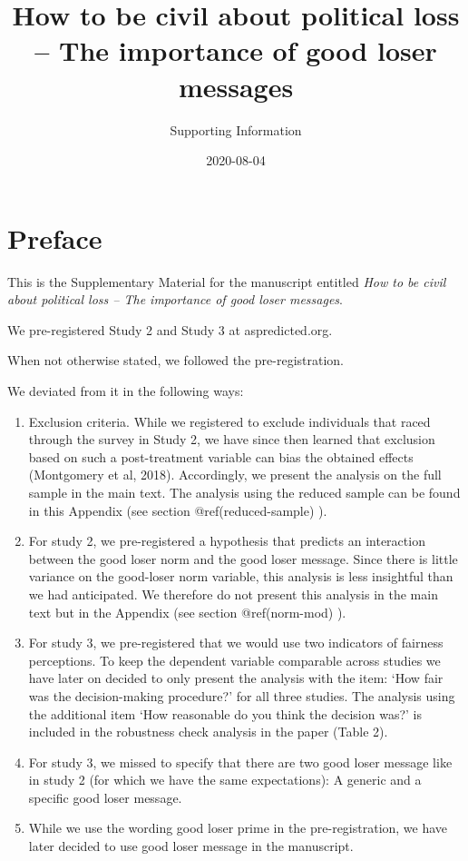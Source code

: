 \documentclass[
]{book}
\title{How to be civil about political loss -- The importance of good loser
messages}
\subtitle{Supporting Information}
\author{}
\date{\vspace{-2.5em}2020-08-04}
\begin{document}
\frontmatter
\maketitle

\mainmatter
\hypertarget{preface}{%
\chapter{Preface}\label{preface}}

This is the Supplementary Material for the manuscript entitled \emph{How
to be civil about political loss -- The importance of good loser
messages}.

We pre-registered Study 2 and Study 3 at aspredicted.org.

When not otherwise stated, we followed the pre-registration.

We deviated from it in the following ways:

\begin{enumerate}
\def\labelenumi{\arabic{enumi}.}
\item
  Exclusion criteria. While we registered to exclude individuals that
  raced through the survey in Study 2, we have since then learned that
  exclusion based on such a post-treatment variable can bias the
  obtained effects (Montgomery et al, 2018). Accordingly, we present the
  analysis on the full sample in the main text. The analysis using the
  reduced sample can be found in this Appendix (see section
  @ref(reduced-sample) ).
\item
  For study 2, we pre-registered a hypothesis that predicts an
  interaction between the good loser norm and the good loser message.
  Since there is little variance on the good-loser norm variable, this
  analysis is less insightful than we had anticipated. We therefore do
  not present this analysis in the main text but in the Appendix (see
  section @ref(norm-mod) ).
\item
  For study 3, we pre-registered that we would use two indicators of
  fairness perceptions. To keep the dependent variable comparable across
  studies we have later on decided to only present the analysis with the
  item: `How fair was the decision-making procedure?' for all three
  studies. The analysis using the additional item `How reasonable do you
  think the decision was?' is included in the robustness check analysis
  in the paper (Table 2).
\item
  For study 3, we missed to specify that there are two good loser
  message like in study 2 (for which we have the same expectations): A
  generic and a specific good loser message.
\item
  While we use the wording good loser prime in the pre-registration, we
  have later decided to use good loser message in the manuscript.
\end{enumerate}
\end{document}

